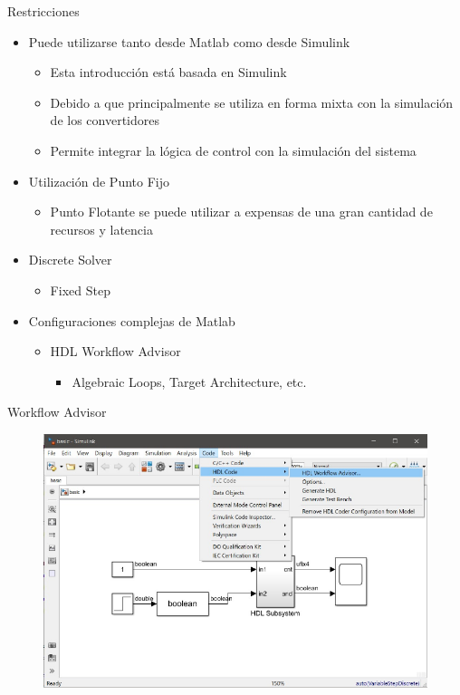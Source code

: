 \documentclass{beamer}
\begin{document}
\begin{frame}{Restricciones}
\begin{itemize}
	\item Puede utilizarse tanto desde Matlab como desde Simulink
	\begin{itemize}
		\item Esta introducción está basada en Simulink
		\item Debido a que principalmente se utiliza en forma mixta con la simulación de los convertidores
		\item Permite integrar la lógica de control con la simulación del sistema
	\end{itemize}
	\item Utilización de Punto Fijo
	\begin{itemize}
		\item Punto Flotante se puede utilizar a expensas de una gran cantidad de recursos y latencia
	\end{itemize}
	\item Discrete Solver
	\begin{itemize}
		\item Fixed Step
	\end{itemize}
	\item Configuraciones complejas de Matlab
	\begin{itemize}
		\item HDL Workflow Advisor
		\begin{itemize}
			\item Algebraic Loops, Target Architecture, etc.
		\end{itemize}
	\end{itemize}
\end{itemize}
\end{frame}

\begin{frame}{Workflow Advisor}
\begin{figure}
	\includegraphics[page=1]{figs/figs.pdf}
\end{figure}
\end{frame}
\end{document}
